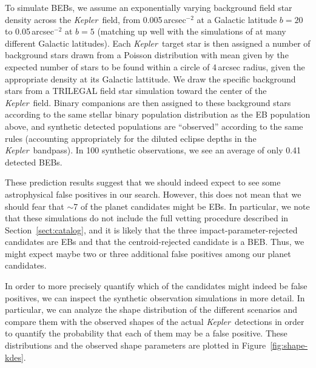 \documentclass[manuscript, letterpaper]{aastex6}
\newcommand{\project}[1]{\textsl{#1}}
\newcommand{\kepler}{\project{Kepler}}
\newcommand{\dfmfigref}[1]{\ref{fig:#1}}
\newcommand{\dfmFig}[1]{Figure~\dfmfigref{#1}}
\newcommand{\dfmfig}[1]{\dfmFig{#1}}
\newcommand{\sectionname}{Section}
\newcommand{\sectref}[1]{\ref{sect:#1}}
\newcommand{\Sect}[1]{\sectionname~\sectref{#1}}
\newcommand{\sect}[1]{\Sect{#1}}
\begin{document}
To simulate BEBs, we assume an exponentially varying background field star
density across the \kepler\ field, from 0.005\,arcsec$^{-2}$ at a Galactic
latitude $b=20$ to 0.05\,arcsec$^{-2}$ at $b=5$ (matching up well with the
simulations of \citet{Morton:2011} at many different Galactic latitudes). Each
\kepler\ target star is then assigned a number of background stars drawn from
a Poisson distribution with mean given by the expected number of stars to be
found within a circle of 4\,arcsec radius, given the  appropriate density at
its Galactic lattitude.   We draw the specific background stars from a
TRILEGAL \citep{Girardi:2005}  field star simulation toward the center of the
\kepler\ field.  Binary companions are then assigned to these background stars
according to the same stellar binary population distribution as the EB
population above, and synthetic detected populations  are ``observed''
according to the same rules (accounting appropriately for the diluted eclipse
depths in the \kepler\ bandpass).  In 100 synthetic observations, we see an
average of only 0.41 detected BEBs.

These prediction results suggest that we should indeed expect to see some 
astrophysical false positives in our search.  However, this does not mean that  we
should fear that $\sim$7 of the planet candidates might be EBs. In particular,
we note that these simulations do not include the full vetting procedure 
described in \sect{catalog}, and it is likely that the three impact-parameter-rejected
candidates are EBs and that the centroid-rejected candidate is a BEB.  Thus,
we might expect maybe two or three additional false positives among our planet
candidates.

In order to more precisely quantify which of the candidates might indeed be false
positives, we can inspect the synthetic observation simulations in more detail. In
particular, we can analyze the shape distribution of the different scenarios and
compare them with the observed shapes of the actual \kepler\ detections in order
to quantify the probability that each of them may be a false positive.
These distributions and the observed shape parameters are plotted in
\dfmfig{shape-kdes}.
\end{document}
